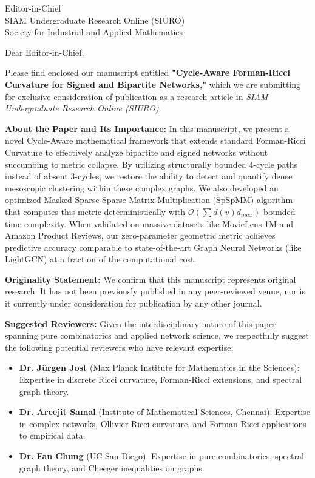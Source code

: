 \documentclass[11pt]{letter}
\begin{document}
\begin{letter}{
  Editor-in-Chief \\
  SIAM Undergraduate Research Online (SIURO) \\
  Society for Industrial and Applied Mathematics
}

\opening{Dear Editor-in-Chief,}

Please find enclosed our manuscript entitled \textbf{"Cycle-Aware Forman-Ricci Curvature for Signed and Bipartite Networks,"} which we are submitting for exclusive consideration of publication as a research article in \textit{SIAM Undergraduate Research Online (SIURO)}.

\textbf{About the Paper and Its Importance:}
In this manuscript, we present a novel Cycle-Aware mathematical framework that extends standard Forman-Ricci Curvature to effectively analyze bipartite and signed networks without succumbing to metric collapse. By utilizing structurally bounded 4-cycle paths instead of absent 3-cycles, we restore the ability to detect and quantify dense mesoscopic clustering within these complex graphs. We also developed an optimized Masked Sparse-Sparse Matrix Multiplication (SpSpMM) algorithm that computes this metric deterministically with $\mathcal{O}(\sum d(v) d_{max})$ bounded time complexity. When validated on massive datasets like MovieLens-1M and Amazon Product Reviews, our zero-parameter geometric metric achieves predictive accuracy comparable to state-of-the-art Graph Neural Networks (like LightGCN) at a fraction of the computational cost.

\textbf{Originality Statement:}
We confirm that this manuscript represents original research. It has not been previously published in any peer-reviewed venue, nor is it currently under consideration for publication by any other journal. 

\textbf{Suggested Reviewers:}
Given the interdisciplinary nature of this paper spanning pure combinatorics and applied network science, we respectfully suggest the following potential reviewers who have relevant expertise:
\begin{itemize}
    \item \textbf{Dr. J\"urgen Jost} (Max Planck Institute for Mathematics in the Sciences): Expertise in discrete Ricci curvature, Forman-Ricci extensions, and spectral graph theory.
    \item \textbf{Dr. Areejit Samal} (Institute of Mathematical Sciences, Chennai): Expertise in complex networks, Ollivier-Ricci curvature, and Forman-Ricci applications to empirical data.
    \item \textbf{Dr. Fan Chung} (UC San Diego): Expertise in pure combinatorics, spectral graph theory, and Cheeger inequalities on graphs.
\end{itemize}


\end{letter}
\end{document}
